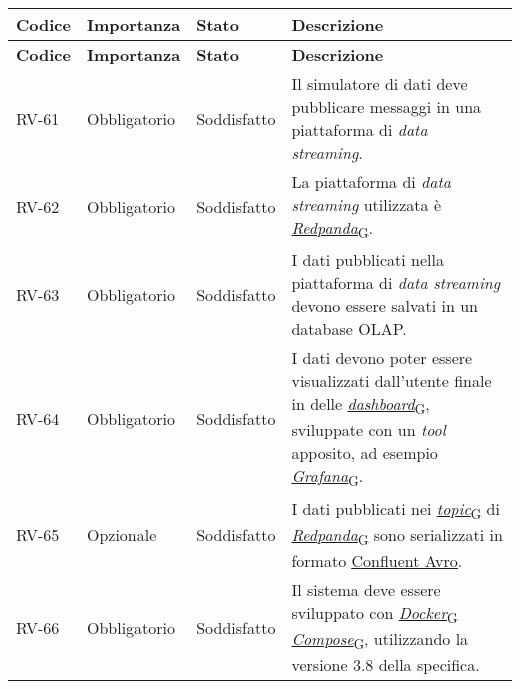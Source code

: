 \begin{longtable}{|>{\centering\arraybackslash}m{}|>{\centering\arraybackslash}m{}|>{\centering\arraybackslash}m{}|>{\centering\arraybackslash}m{}|}
	\hline
	\textbf{Codice} & \textbf{Importanza} & \textbf{Stato}& \textbf{Descrizione}\\\hline
	\endfirsthead
	\hline
	\textbf{Codice} & \textbf{Importanza} & \textbf{Stato}& \textbf{Descrizione}\\\hline
	\endhead
	\hline
	RV-61           & Obbligatorio        & Soddisfatto & Il simulatore di dati deve pubblicare messaggi in una piattaforma di \textit{data streaming}.
	\\\hline
	RV-62           & Obbligatorio        & Soddisfatto                                                                                                           & La piattaforma di \textit{data streaming} utilizzata è \href{https://7last.github.io/docs/pb/documentazione-interna/glossario\#redpanda}{\textit{Redpanda}\textsubscript{G}}.
	\\\hline
	RV-63           & Obbligatorio        & Soddisfatto & I dati pubblicati nella piattaforma di \textit{data streaming} devono essere salvati in un database OLAP.
	\\\hline
	RV-64           & Obbligatorio        & Soddisfatto & I dati devono poter essere visualizzati dall'utente finale in delle \href{https://7last.github.io/docs/pb/documentazione-interna/glossario\#dashboard}{\textit{dashboard}\textsubscript{G}}, sviluppate con un \textit{tool} apposito, ad esempio \href{https://7last.github.io/docs/pb/documentazione-interna/glossario\#grafana}{\textit{Grafana}\textsubscript{G}}.
	\\\hline
	RV-65           & Opzionale           & Soddisfatto                                                                                                           & I dati pubblicati nei \href{https://7last.github.io/docs/pb/documentazione-interna/glossario\#topic}{\textit{topic}\textsubscript{G}} di \href{https://7last.github.io/docs/pb/documentazione-interna/glossario\#redpanda}{\textit{Redpanda}\textsubscript{G}} sono serializzati in formato \href{https://docs.confluent.io/platform/current/schema-registry/fundamentals/serdes-develop/serdes-avro.html}{\underline{Confluent Avro}}.
	\\\hline
	RV-66           & Obbligatorio        & Soddisfatto                                                                                                           & Il sistema deve essere sviluppato con \href{https://7last.github.io/docs/pb/documentazione-interna/glossario\#docker-compose}{\href{https://7last.github.io/docs/pb/documentazione-interna/glossario\#docker}{\textit{Docker}\textsubscript{G}}\textit{ Compose}\textsubscript{G}}, utilizzando la versione 3.8 della specifica.

\end{longtable}
